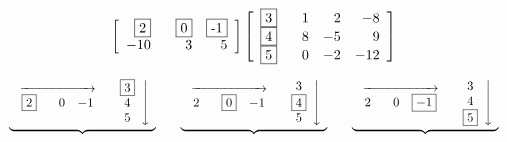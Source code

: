 \documentclass{ximera}
\begin{document}
\[ \left[\begin{array}{rrr} \fbox{2} & \hphantom{-}\fbox{0} & \fbox{-1} \\ -10 & 3 & 5 \\ \end{array} \right] \left[\begin{array}{rrrr}  \fbox{3} & \hphantom{-}1 & 2 & -8 \\ \fbox{4} & 8 & -5 & 9  \\ \fbox{5} & 0 & -2 & -12 \\  \end{array} \right] \]


\[ \begin{array}{ccccc}

 \underbrace{\begin{array}{rl} \stackrel{\xrightarrow{\hspace{.75in}}}{\begin{array}{ccc} \fbox{2} &  \hphantom{-}0 & -1 \end{array}} & \left. \begin{array}{c} \fbox{3}  \\ 4   \\ 5  \\ \end{array} \right\downarrow \\ \end{array}}

&

&

\underbrace{\begin{array}{rl} \stackrel{\xrightarrow{\hspace{.75in}}}{\begin{array}{ccc} 2 & \hphantom{-}\fbox{0} & -1 \end{array}} &  \left.  \begin{array}{c} 3 \\ \fbox{4}    \\ 5  \\ \end{array} \right\downarrow \\\end{array}}

& 


&


\underbrace{\begin{array}{rl} \stackrel{\xrightarrow{\hspace{.75in}}}{\begin{array}{ccc} 2 & \hphantom{-}0 & \fbox{$-1$} \end{array}} &  \left. \begin{array}{c} 3 \\ 4 \\ \fbox{5}   \\ \end{array} \right\downarrow \\ \end{array}}  \\


\end{array}\]
\end{document}
